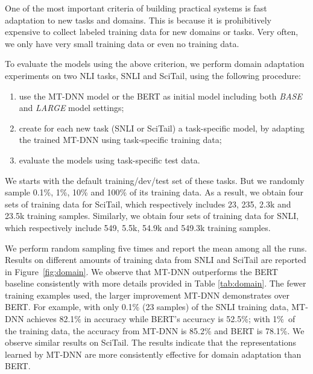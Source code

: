 One of the most important criteria of building practical systems is fast adaptation to new tasks and domains. This is because it is prohibitively expensive to collect labeled training data for new domains or tasks. Very often, we only have very small training data or even no training data.

To evaluate the models using the above criterion, we perform domain adaptation experiments on two NLI tasks, SNLI and SciTail, using the following procedure:
\begin{enumerate}
    \item use the MT-DNN model or the BERT as initial model including both \textit{BASE} and \textit{LARGE} model settings;
    \item create for each new task (SNLI or SciTail) a task-specific model, by adapting the trained MT-DNN using task-specific training data;
    \item evaluate the models using task-specific test data.
\end{enumerate}


We starts with the default training/dev/test set of these tasks. But we randomly sample 0.1\%, 1\%, 10\% and 100\% of its training data. As a result, we obtain four sets of training data for SciTail, which respectively includes  23, 235, 2.3k and 23.5k training samples. Similarly, we obtain four sets of training data for SNLI, which respectively include 549, 5.5k, 54.9k and 549.3k training samples.

We perform  random sampling five times and report the mean among all the runs. Results on different amounts of training data from SNLI and SciTail are reported in Figure~\ref{fig:domain}. We observe that MT-DNN  outperforms the BERT baseline consistently with more details provided in Table \ref{tab:domain}. 
The fewer training examples used, the larger improvement MT-DNN demonstrates over BERT. For example, with only 0.1\% (23 samples) of the SNLI training data, MT-DNN achieves 82.1\% in accuracy while BERT's accuracy is 52.5\%; with 1\%\ of the training data, the accuracy from MT-DNN is 85.2\% and BERT is 78.1\%. We observe similar results on SciTail. 
The results indicate that the representations learned by MT-DNN are more consistently effective for domain adaptation than BERT.


